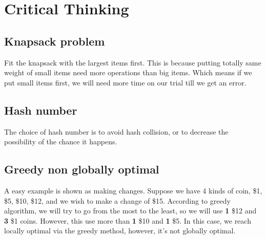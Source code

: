 \documentclass[A4paper]{article}
\begin{document}
\section{Critical Thinking}
\subsection{Knapsack problem}
Fit the knapsack with the largest items first. This is because putting totally same weight of small items need more operations than big items. Which means if we put small items first, we will need more time on our trial till we get an error. 
\subsection{Hash number}
The choice of hash number is to avoid hash collision, or to decrease the possibility of the chance it happens. 
\subsection{Greedy non globally optimal}
A easy example is shown as making changes. Suppose we have 4 kinds of coin, \$1, \$5, \$10, \$12, and we wish to make a change of \$15. According to greedy algorithm, we will try to go from the most to the least, so we will use \textbf{1} \$12 and \textbf{3} \$1 coins. However, this use more than \textbf{1} \$10 and \textbf{1} \$5. In this case, we reach locally optimal via the greedy method, however, it's not globally optimal.
\end{document}
